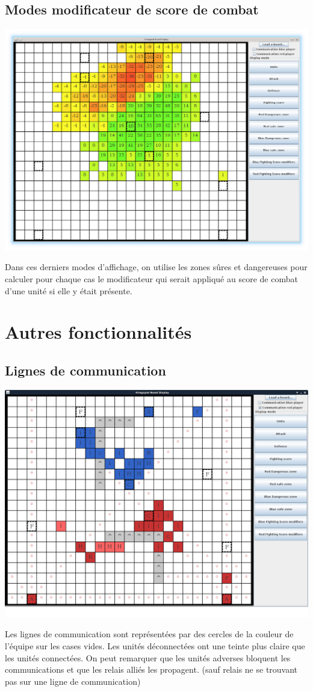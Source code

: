 		\subsection{Modes modificateur de score de combat}
			\centerline{\includegraphics[scale=0.5]{images/screen_fsmod.png}}
			Dans ces derniers modes d'affichage, on utilise les zones sûres et dangereuses pour calculer pour chaque cas le modificateur
			qui serait appliqué au score de combat d'une unité si elle y était présente.

	\section{Autres fonctionnalités}

		\subsection{Lignes de communication}

			\centerline{\includegraphics[scale=0.4]{images/screen_com.png}}
			Les lignes de communication sont représentées par des cercles de la couleur de l'équipe sur les cases vides.
			Les unités déconnectées ont une teinte plus claire que les unités connectées.
			On peut remarquer que les unités adverses bloquent les communications et que les relais alliés les propagent. 
			(sauf relais ne se trouvant pas sur une ligne de communication)
			
